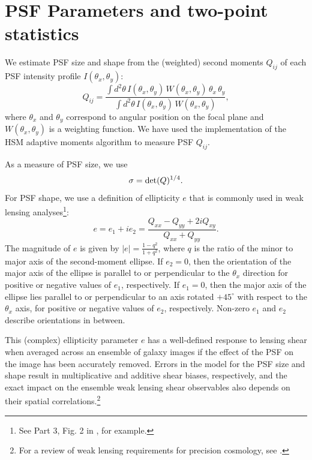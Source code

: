 \documentclass[twocolumn,twocolappendix]{openjournal}
\begin{document}
\section{PSF Parameters and two-point statistics}\label{sec:definitions2pcf}

We estimate PSF size and shape from the (weighted) second moments $Q_{ij}$ of each PSF intensity profile $I(\theta_x, \theta_y)$:
\begin{equation}
    Q_{ij} = \frac{\int d^2\theta \, I(\theta_x,\theta_y) \, W(\theta_x,\theta_y) \, \theta_x \, \theta_y }{ \int d^2\theta \, I(\theta_x,\theta_y) \, W(\theta_x,\theta_y)},
\end{equation}
where $\theta_x$ and  $\theta_y$ correspond to angular position on the focal plane and $W(\theta_x,\theta_y)$ is a weighting function. 
We have used the \galsim implementation of the HSM adaptive moments algorithm \citep{hirata_shear_2003} to measure PSF $Q_{ij}$.

As a measure of PSF size, we use 
\begin{equation}
    \sigma = {\rm det}(Q)^{1/4}. 
\end{equation}
For PSF shape, we use a definition of ellipticity $e$ that is commonly used in weak lensing analyses\footnote{See Part 3, Fig. 2 in \cite{schneider_gravitational_2006}, for example.}: 
\begin{equation}
    e = e_1 + i e_2 = \frac{Q_{xx} - Q_{yy} + 2iQ_{xy}}{Q_{xx} + Q_{yy}}. 
    \label{eqn:e_def12}
\end{equation}
The magnitude of $e$ is given by  $|e| = \frac{1-q^2}{1+q^2}$, where $q$ is the ratio of the minor to major axis of the second-moment ellipse. 
If $e_2=0$, then the orientation of the major axis of the ellipse is parallel to or perpendicular to the $\theta_x$ direction for positive or negative values of $e_1$, respectively. 
If $e_1=0$, then the major axis of the ellipse lies parallel to or perpendicular to an axis rotated $+45^\circ$ with respect to the $\theta_x$ axis, for positive or negative values of $e_2$, respectively.
Non-zero $e_1$ and $e_2$ describe orientations in between. 

This (complex) ellipticity parameter $e$ has a well-defined response to lensing shear when averaged across an ensemble of galaxy images if the effect of the PSF on the image has been accurately removed. 
Errors in the model for the PSF size and shape result in multiplicative and additive shear biases, respectively, and the exact impact on the ensemble weak lensing shear observables also depends on their spatial correlations.\footnote{For a review of weak lensing requirements for precision cosmology, see \cite{mandelbaum_weak_2018}.} 
\end{document}
